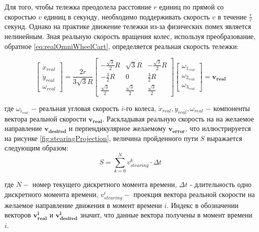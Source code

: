 \documentclass[oneside,final,14pt]{extreport}
\newcommand{\bs}{\boldsymbol}
\begin{document}
Для того, чтобы тележка преодолела расстояние $r$ единиц  по прямой  со скоростью $v$ единиц в секунду, необходимо поддерживать скорость $v$  в течение $\frac{r}{v}$ секунд. Однако на практике движение тележки из-за физических помех является нелинейным. Зная реальную скорость вращения колес, используя преобразование, обратное \ref{eq:realOmniWheelCart}, определяется реальная скорость тележки:

\begin{equation}
\label{eq:reverseRealOmniWheelCart}
\begin{bmatrix}
\dot{x}_{real} \\
\dot{y}_{real} \\
\omega_{real}
\end{bmatrix}
=
\frac{2r}{3 \sqrt{3} R }
\begin{bmatrix}
-\frac{\sqrt{3}}{2} R &
 \sqrt{3}  R&
-\frac{\sqrt{3}}{2} R
\\
- \frac{3}{2} R&
0 &
 \frac{3}{2} R
\\
\frac{\sqrt{3}}{2} &
\frac{\sqrt{3}}{2} &
\frac{\sqrt{3}}{2}
\end{bmatrix}
\begin{bmatrix}
\omega_{1_{real}} \\
\omega_{2_{real}} \\
\omega_{3_{real}}
\end{bmatrix}
=
\bs{v_{real}}
\end{equation}

где $\omega_{i_{real}}$ $-$ реальная угловая скорость $i$-го  колеса, $\dot{x}_{real},
\dot{y}_{real},
\omega_{real}$ $-$ компоненты вектора реальной скорости $\bs{v_{real}}$. 
Раскладывая реальную скорость на на желаемое направление $\bs{v_{desired}}$ и перпендикулярное желаемому $\bs{v_{error}}$, что иллюстрируется на рисунке \ref{fig:stearingProjection}, величина пройденного пути $S$ выражается следующим образом:
\begin{equation}
S
=
\sum\limits_{k=0}^N v_{stearing}^k
\cdot
\Delta t
\end{equation}

где $N -$ номер текущего дискретного момента времени, $\Delta t$ - длительность одно дискретного момента времени, $ v_{stearing}^i -$ проекция вектора реальной скорости на желаемое направление движения в момент времени $i$. Индекс в обозначении векторов $\bs{v_{real}^i}$ и $\bs{v_{desired}^i}$ значит, что данные вектора получены в момент времени $i$.

\begin{figure}[H]
\end{figure}
\end{document}
